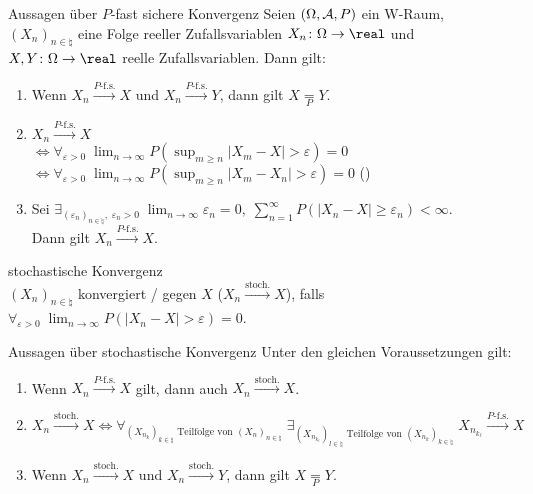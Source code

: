 \begin{Satz}{Aussagen über $P$-fast sichere Konvergenz}
    Seien $(\Omega, \mathcal{A}, P)$ ein W-Raum,
    $(X_n)_{n \in \natural}$ eine Folge reeller Zufallsvariablen
    $X_n\colon \Omega \rightarrow \real$ und
    $X, Y\colon \Omega \rightarrow \real$ reelle Zufallsvariablen.
    Dann gilt:
    \begin{enumerate}
        \item
        Wenn $X_n \xrightarrow{P\text{-f.s.}} X$ und $X_n \xrightarrow{P\text{-f.s.}} Y$,
        dann gilt $X \underset{P}{=} Y$.

        \item
        $X_n \xrightarrow{P\text{-f.s.}} X$\\
        $\iff \forall_{\varepsilon > 0}\; \lim_{n \to \infty}
        P(\sup_{m \ge n} |X_m - X| > \varepsilon) = 0$\\
        $\iff \forall_{\varepsilon > 0}\; \lim_{n \to \infty}
        P(\sup_{m \ge n} |X_m - X_n| > \varepsilon) = 0$
        ()

        \item
        Sei $\exists_{(\varepsilon_n)_{n \in \natural},\; \varepsilon_n > 0}\;
        \lim_{n \to \infty} \varepsilon_n = 0,\;
        \sum_{n=1}^\infty P(|X_n - X| \ge \varepsilon_n) < \infty$.\\
        Dann gilt $X_n \xrightarrow{P\text{-f.s.}} X$.
    \end{enumerate}
\end{Satz}

\linie

\begin{Def}{stochastische Konvergenz}\\
    $(X_n)_{n \in \natural}$ konvergiert / gegen $X$
    ($X_n \xrightarrow{\text{stoch.}} X$), falls\\
    $\forall_{\varepsilon > 0}\; \lim_{n \to \infty} P(|X_n - X| > \varepsilon) = 0$.
\end{Def}

\begin{Satz}{Aussagen über stochastische Konvergenz}
    Unter den gleichen Voraussetzungen gilt:
    \begin{enumerate}
        \item
        Wenn $X_n \xrightarrow{P\text{-f.s.}} X$ gilt, dann auch
        $X_n \xrightarrow{\text{stoch.}} X$.

        \item
        $X_n \xrightarrow{\text{stoch.}} X
        \iff \forall_{(X_{n_k})_{k \in \natural} \text{ Teilfolge von } (X_n)_{n \in \natural}}\;
        \exists_{(X_{n_{k_\ell}})_{l \in \natural} \text{ Teilfolge von }
        (X_{n_k})_{k \in \natural}}\; X_{n_{k_\ell}} \xrightarrow{P\text{-f.s.}} X$

        \item
        Wenn $X_n \xrightarrow{\text{stoch.}} X$ und $X_n \xrightarrow{\text{stoch.}} Y$,
        dann gilt $X \underset{P}{=} Y$.
    \end{enumerate}
\end{Satz}

